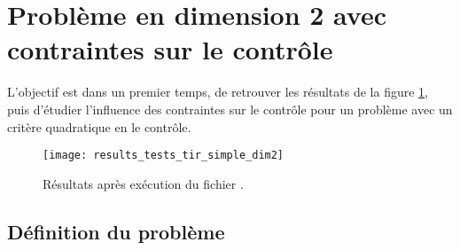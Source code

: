 \section{Probl\`eme en dimension 2 avec contraintes sur le contr\^ole}

L'objectif est dans un premier temps, de retrouver les r\'esultats de la figure \ref{fig:results_tests_tir_simple_dim2}, puis
d'\'etudier l'influence des contraintes sur le contr\^ole pour un probl\`eme avec un crit\`ere quadratique en le contr\^ole.

\begin{figure}[ht!]
    \begin{center}
        \texttt{[image: results\_tests\_tir\_simple\_dim2]}
    \end{center}
    \caption{R\'esultats apr\`es ex\'ecution du fichier .}
    \label{fig:results_tests_tir_simple_dim2}
\end{figure}

\subsection{D\'efinition du probl\`eme}

